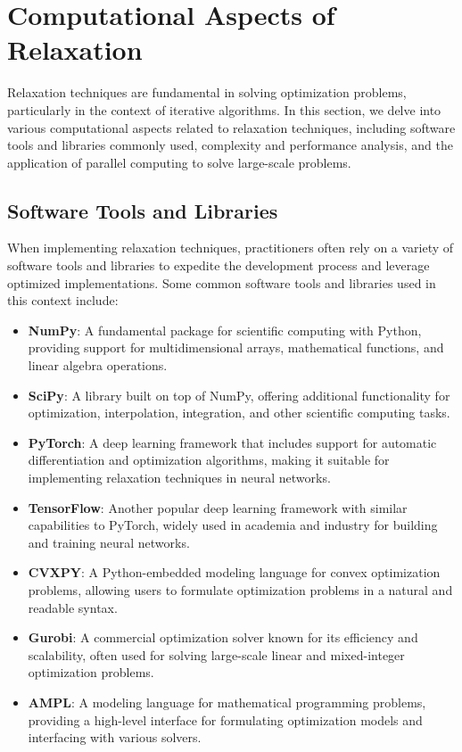 \documentclass[12pt]{book} %
\begin{document}
\section{Computational Aspects of Relaxation}

Relaxation techniques are fundamental in solving optimization problems, particularly in the context of iterative algorithms. In this section, we delve into various computational aspects related to relaxation techniques, including software tools and libraries commonly used, complexity and performance analysis, and the application of parallel computing to solve large-scale problems.

\subsection{Software Tools and Libraries}

When implementing relaxation techniques, practitioners often rely on a variety of software tools and libraries to expedite the development process and leverage optimized implementations. Some common software tools and libraries used in this context include:

\begin{itemize}
    \item \textbf{NumPy}: A fundamental package for scientific computing with Python, providing support for multidimensional arrays, mathematical functions, and linear algebra operations.
    \item \textbf{SciPy}: A library built on top of NumPy, offering additional functionality for optimization, interpolation, integration, and other scientific computing tasks.
    \item \textbf{PyTorch}: A deep learning framework that includes support for automatic differentiation and optimization algorithms, making it suitable for implementing relaxation techniques in neural networks.
    \item \textbf{TensorFlow}: Another popular deep learning framework with similar capabilities to PyTorch, widely used in academia and industry for building and training neural networks.
    \item \textbf{CVXPY}: A Python-embedded modeling language for convex optimization problems, allowing users to formulate optimization problems in a natural and readable syntax.
    \item \textbf{Gurobi}: A commercial optimization solver known for its efficiency and scalability, often used for solving large-scale linear and mixed-integer optimization problems.
    \item \textbf{AMPL}: A modeling language for mathematical programming problems, providing a high-level interface for formulating optimization models and interfacing with various solvers.
\end{itemize}
\end{document}
